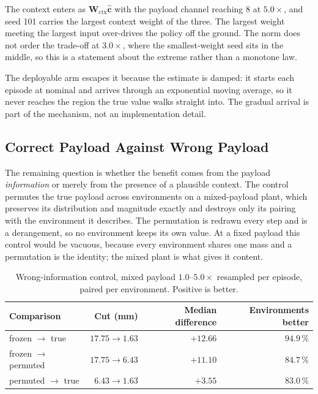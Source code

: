 The context enters as $\bm{W}_{\mathrm{ctx}}\hat{\bm{c}}$ with the payload
channel reaching $8$ at $5.0\times$, and seed 101 carries the largest context
weight of the three. The largest weight meeting the largest input over-drives
the policy off the ground. The norm does not order the trade-off at $3.0\times$,
where the smallest-weight seed sits in the middle, so this is a statement about
the extreme rather than a monotone law.

The deployable arm escapes it because the estimate is damped: it starts each
episode at nominal and arrives through an exponential moving average, so it
never reaches the region the true value walks straight into. The gradual arrival
is part of the mechanism, not an implementation detail.

\subsection{Correct Payload Against Wrong Payload}
\label{sec:eval:attribution}

The remaining question is whether the benefit comes from the payload
\emph{information} or merely from the presence of a plausible context. The
control permutes the true payload across environments on a mixed-payload plant,
which preserves its distribution and magnitude exactly and destroys only its
pairing with the environment it describes. The permutation is redrawn every step
and is a derangement, so no environment keeps its own value. At a fixed payload
this control would be vacuous, because every environment shares one mass and a
permutation is the identity; the mixed plant is what gives it content.

\begin{table}[H]
  \centering
  \caption{Wrong-information control, mixed payload $1.0$--$5.0\times$ resampled
  per episode, paired per environment. Positive is better.}
  \label{tab:eval:wronginfo}
  \small
  \begin{tabular}{@{}lrrr@{}}
    \toprule
    Comparison & Cut (mm) & Median difference & Environments better \\
    \midrule
    frozen $\rightarrow$ true      & $17.75 \rightarrow 1.63$ & $+12.66$ & $94.9\,\%$ \\
    frozen $\rightarrow$ permuted  & $17.75 \rightarrow 6.43$ & $+11.10$ & $84.7\,\%$ \\
    permuted $\rightarrow$ true    & $6.43 \rightarrow 1.63$  &  $+3.55$ & $83.0\,\%$ \\
    \bottomrule
  \end{tabular}
\end{table}

